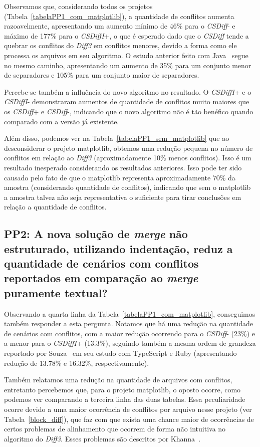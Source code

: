 Observamos que, considerando todos os projetos
(Tabela~\ref{tabelaPP1_com_matplotlib}), a quantidade de conflitos aumenta
razoavelmente, apresentando um aumento mínimo de 46\% para o \emph{CSDiff}- e
máximo de 177\% para o \emph{CSDiffI}+, o que é esperado dado que o
\emph{CSDiff} tende a quebrar os conflitos do \emph{Diff3} em conflitos
menores, devido a forma como ele processa os arquivos em seu algoritmo. O
estudo anterior feito com Java~\cite{clem21} segue no mesmo caminho,
apresentando um aumento de 35\% para um conjunto menor de separadores e 105\%
para um conjunto maior de separadores.

Percebe-se também a influência do novo algoritmo no resultado. O
\emph{CSDiffI}+ e o \emph{CSDiffI}- demonstraram aumentos de quantidade de
conflitos muito maiores que os \emph{CSDiff}+ e \emph{CSDiff}-, indicando que o
novo algoritmo não é tão benéfico quando comparado com a versão já existente.

Além disso, podemos ver na Tabela~\ref{tabelaPP1_sem_matplotlib} que ao
desconsiderar o projeto matplotlib, obtemos uma redução pequena no número de
conflitos em relação ao \emph{Diff3} (aproximadamente 10\% menos conflitos).
Isso é um resultado inesperado considerando os resultados anteriores. Isso pode
ter sido causado pelo fato de que o matplotlib representa aproximadamente 70\%
da amostra (considerando quantidade de conflitos), indicando que sem o
matplotlib a amostra talvez não seja representativa o suficiente para tirar
conclusões em relação a quantidade de conflitos.

\subsection{PP2: A nova solução de \emph{merge} não estruturado, utilizando
indentação, reduz a quantidade de cenários com conflitos reportados em
comparação ao \emph{merge} puramente textual?}\label{resultado_pp2}

Observando a quarta linha da Tabela~\ref{tabelaPP1_com_matplotlib}, conseguimos
também responder a esta pergunta. Notamos que há uma redução na quantidade de
cenários com conflitos, com a maior redução ocorrendo para o \emph{CSDiff}-
(23\%) e a menor para o \emph{CSDiffI}+ (13.3\%), seguindo também a mesma ordem
de grandeza reportado por Souza~\cite{heitor21} em seu estudo com TypeScript e Ruby
(apresentando redução de 13.78\% e 16.32\%, respectivamente).

Também relatamos uma redução na quantidade de arquivos com conflitos,
entretanto percebemos que, para o projeto matplotlib, o oposto ocorre, como
podemos ver comparando a terceira linha das duas tabelas. Essa peculiaridade
ocorre devido a uma maior ocorrência de conflitos por arquivo nesse projeto
(ver Tabela~\ref{block_diff}), que faz com que exista uma chance maior de
ocorrências de certos problemas de alinhamento que ocorrem de forma não
intuitiva no algoritmo do \emph{Diff3}. Esses problemas são descritos por
Khanna~\cite{khan07}.

